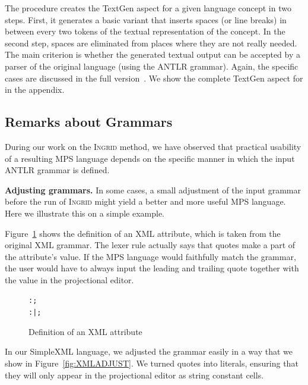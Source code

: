 The procedure creates the TextGen aspect for a given language concept in two steps.
First, it generates a basic variant that inserts spaces (or line breaks) in between every two tokens of the textual representation of the concept.
In the second step, spaces are eliminated from places where they are not really needed.
The main criterion is whether the generated textual output can be accepted by a parser of the original language (using the ANTLR grammar).
Again, the specific cases are discussed in the full version~\cite{ref:TRFULL}.
We show the complete TextGen aspect for  in the appendix.

\subsection{Remarks about Grammars}
\label{sect:REMARKSGRAMMARS}

During our work on the \textsc{Ingrid} method, we have observed that practical usability of a resulting MPS language depends on the specific manner in which the input ANTLR grammar is defined.

\noindent\textbf{Adjusting grammars.}
In some cases, a small adjustment of the input grammar before the run of \textsc{Ingrid} might yield a better and more useful MPS language.
Here we illustrate this on a simple example.

Figure~\ref{fig:XMLATTRIB} shows the definition of an XML attribute, which is taken from the original XML grammar.
The lexer rule  actually says that quotes make a part of the attribute's value.
If the MPS language would faithfully match the grammar, the user would have to always input the leading and trailing quote together with the value in the projectional editor.

\begin{figure}[ht]
\vspace{-1mm}
\begin{alltt}
\small
   :  \antlrliteral{=}  ;
   :  \antlrregex{~["]*}  |  \antlrregex{~[']*}  ;
\end{alltt}
\caption{Definition of an XML attribute}
\label{fig:XMLATTRIB}
\end{figure}

In our SimpleXML language, we adjusted the grammar easily in a way that we show in Figure~\ref{fig:XMLADJUST}.
We turned quotes into literals, ensuring that they will only appear in the projectional editor as string constant cells.

